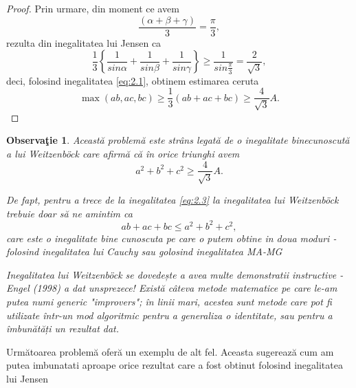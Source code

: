 \documentclass[a4paper,12pt,oneside]{report}
\newtheorem{remark}{Observa\c{t}ie}
\begin{document}
\begin{proof}
	Prin urmare, din moment ce avem \[\frac{\left ( \alpha + \beta  + \gamma  \right )}{3}= \frac{\pi }{3},\] rezulta din inegalitatea lui Jensen ca
\begin{displaymath}
  \frac{1}{3}\left \{ \frac{1}{sin \alpha }  + \frac{1}{sin \beta } + \frac{1}{sin \gamma }\right \}\geq \frac{1}{sin \frac{\pi }{3}} =  \frac{2}{\sqrt{3}},
\end{displaymath}
deci, folosind inegalitatea \ref{eq:2.1}, obtinem estimarea ceruta
\begin{displaymath}
 \max \left ( ab, ac, bc \right )\geq \frac{1}{3}\left ( ab + ac + bc \right )\geq \frac{4}{\sqrt{3}}A. \label{eq:2.3} \tag{2.3}
\end{displaymath}

\end{proof}
\begin{remark}
Această problemă este strâns legată de o inegalitate binecunoscută a lui Weitzenböck care afirmă că în orice triunghi avem
\begin{displaymath}
  a^{2} + b^{2} + c^{2} \geq \frac{4}{\sqrt{3}}A. \label{eq:2.4} \tag{2.4}
\end{displaymath}

De fapt, pentru a trece de la inegalitatea \ref{eq:2.3} la inegalitatea lui Weitzenböck trebuie doar să ne amintim ca
\begin{displaymath}
  ab + ac + bc \leq a^{2} + b^{2} + c^{2},
\end{displaymath}
care este o inegalitate bine cunoscuta pe care o putem obtine in doua moduri  - folosind inegalitatea lui Cauchy sau golosind inegalitatea MA-MG

	Inegalitatea lui Weitzenböck se dovedește a avea multe demonstratii instructive - Engel (1998) a dat unsprezece!
Există câteva metode matematice pe care le-am putea numi generic "improvers"; în linii mari, acestea sunt metode care pot fi utilizate într-un mod algoritmic pentru a generaliza o identitate, sau pentru a îmbunătăți un rezultat dat.
\end{remark}
Următoarea problemă oferă un exemplu de alt fel. Aceasta sugerează cum am putea imbunatati aproape orice rezultat care a fost obtinut folosind inegalitatea lui Jensen
\end{document}
